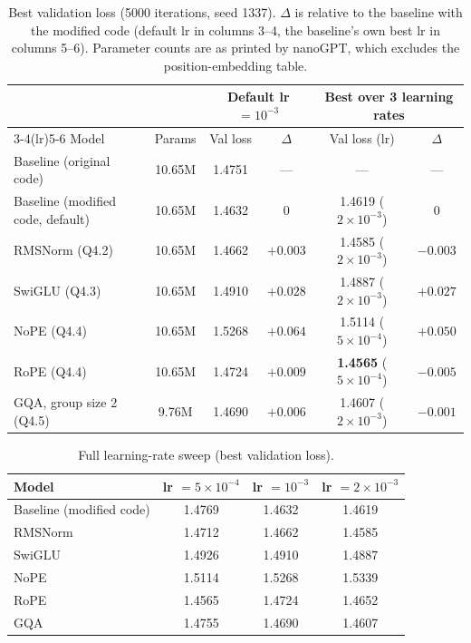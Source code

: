 \documentclass[11pt]{article}
\begin{document}
\begin{table}[h]
\centering
\small
\begin{tabular}{@{}lccccc@{}}
\toprule
 & & \multicolumn{2}{c}{Default lr $=10^{-3}$} & \multicolumn{2}{c}{Best over 3 learning rates} \\
\cmidrule(lr){3-4}\cmidrule(lr){5-6}
Model & Params & Val loss & $\Delta$ & Val loss (lr) & $\Delta$ \\
\midrule
Baseline (original code)            & 10.65M & 1.4751 & ---      & ---                      & --- \\
Baseline (modified code, default)   & 10.65M & 1.4632 & 0        & 1.4619 ($2\!\times\!10^{-3}$) & 0 \\
RMSNorm (Q4.2)                      & 10.65M & 1.4662 & $+0.003$ & 1.4585 ($2\!\times\!10^{-3}$) & $-0.003$ \\
SwiGLU (Q4.3)                       & 10.65M & 1.4910 & $+0.028$ & 1.4887 ($2\!\times\!10^{-3}$) & $+0.027$ \\
NoPE (Q4.4)                         & 10.65M & 1.5268 & $+0.064$ & 1.5114 ($5\!\times\!10^{-4}$) & $+0.050$ \\
RoPE (Q4.4)                         & 10.65M & 1.4724 & $+0.009$ & \textbf{1.4565} ($5\!\times\!10^{-4}$) & $-0.005$ \\
GQA, group size 2 (Q4.5)            & 9.76M  & 1.4690 & $+0.006$ & 1.4607 ($2\!\times\!10^{-3}$) & $-0.001$ \\
\bottomrule
\end{tabular}
\caption{Best validation loss (5000 iterations, seed 1337). $\Delta$ is relative to the baseline with the modified code (default lr in columns 3--4, the baseline's own best lr in columns 5--6). Parameter counts are as printed by nanoGPT, which excludes the position-embedding table.}
\label{tab:results}
\end{table}

\begin{table}[h]
\centering
\begin{tabular}{@{}lccc@{}}
\toprule
Model & lr $=5\times10^{-4}$ & lr $=10^{-3}$ & lr $=2\times10^{-3}$ \\
\midrule
Baseline (modified code) & 1.4769 & 1.4632 & 1.4619 \\
RMSNorm & 1.4712 & 1.4662 & 1.4585 \\
SwiGLU  & 1.4926 & 1.4910 & 1.4887 \\
NoPE    & 1.5114 & 1.5268 & 1.5339 \\
RoPE    & 1.4565 & 1.4724 & 1.4652 \\
GQA     & 1.4755 & 1.4690 & 1.4607 \\
\bottomrule
\end{tabular}
\caption{Full learning-rate sweep (best validation loss).}
\label{tab:sweep}
\end{table}
\end{document}

